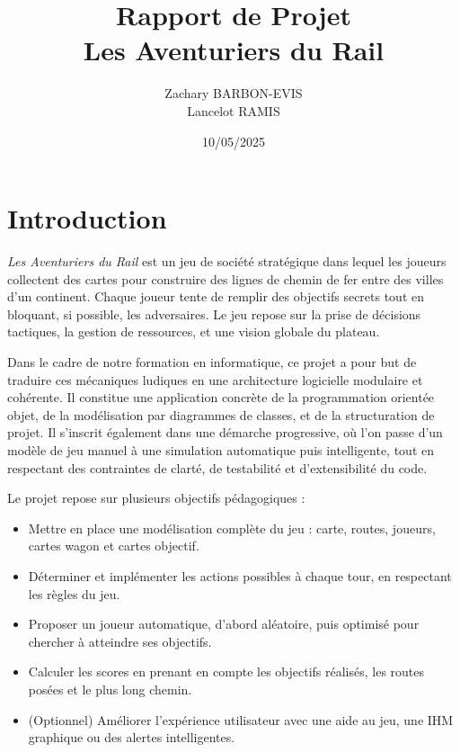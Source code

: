 \documentclass[a4paper,12pt]{report}
\title{Rapport de Projet \\ \textbf{Les Aventuriers du Rail}}
\author{Zachary BARBON-EVIS \\ Lancelot RAMIS}
\date{10/05/2025}
\begin{document}
\BgThispage

\maketitle
\tableofcontents

\chapter*{Introduction}

\textit{Les Aventuriers du Rail} est un jeu de société stratégique dans lequel les joueurs collectent des cartes pour
construire des lignes de chemin de fer entre des villes d’un continent. Chaque joueur tente de remplir des objectifs
secrets tout en bloquant, si possible, les adversaires. Le jeu repose sur la prise de décisions tactiques,
la gestion de ressources, et une vision globale du plateau.

Dans le cadre de notre formation en informatique, ce projet a pour but de traduire ces mécaniques ludiques en une
architecture logicielle modulaire et cohérente. Il constitue une application concrète de la programmation orientée objet,
de la modélisation par diagrammes de classes, et de la structuration de projet.
Il s’inscrit également dans une démarche progressive, où l’on passe d’un modèle de jeu manuel à une simulation
automatique puis intelligente, tout en respectant des contraintes de clarté, de testabilité et d’extensibilité du code.

Le projet repose sur plusieurs objectifs pédagogiques :
\begin{itemize}
    \item Mettre en place une modélisation complète du jeu : carte, routes, joueurs, cartes wagon et cartes objectif.
    \item Déterminer et implémenter les actions possibles à chaque tour, en respectant les règles du jeu.
    \item Proposer un joueur automatique, d’abord aléatoire, puis optimisé pour chercher à atteindre ses objectifs.
    \item Calculer les scores en prenant en compte les objectifs réalisés, les routes posées et le plus long chemin.
    \item (Optionnel) Améliorer l'expérience utilisateur avec une aide au jeu, une IHM graphique ou des alertes intelligentes.
\end{itemize}
\end{document}
